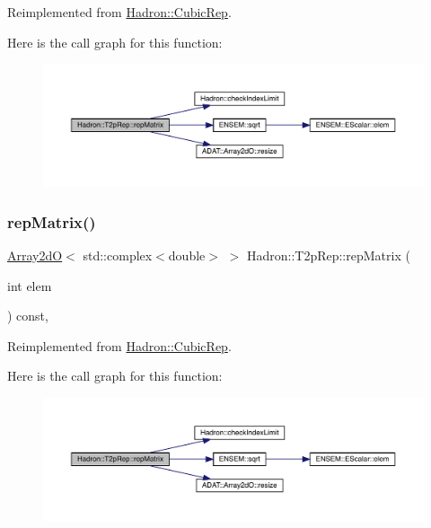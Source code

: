 Reimplemented from \mbox{\hyperlink{structHadron_1_1CubicRep_ac5d7e9e6f4ab1158b5fce3e4ad9e8005}{Hadron\+::\+Cubic\+Rep}}.

Here is the call graph for this function\+:
\nopagebreak
\begin{figure}[H]
\begin{center}
\leavevmode
\includegraphics[width=350pt]{d8/d6b/structHadron_1_1T2pRep_a9800949d2a6f8dcd4dd356947cae0488_cgraph}
\end{center}
\end{figure}
\mbox{\label{structHadron_1_1T2pRep_a9800949d2a6f8dcd4dd356947cae0488}} 
\subsubsection{\texorpdfstring{repMatrix()}{repMatrix()}\hspace{0.1cm}{\footnotesize\ttfamily [3/3]}}
{\footnotesize\ttfamily \mbox{\hyperlink{classADAT_1_1Array2dO}{Array2dO}}$<$ std\+::complex$<$double$>$ $>$ Hadron\+::\+T2p\+Rep\+::rep\+Matrix (\begin{DoxyParamCaption}\item[{int}]{elem }\end{DoxyParamCaption}) const\hspace{0.3cm}{\ttfamily [inline]}, {\ttfamily [virtual]}}



Reimplemented from \mbox{\hyperlink{structHadron_1_1CubicRep_ac5d7e9e6f4ab1158b5fce3e4ad9e8005}{Hadron\+::\+Cubic\+Rep}}.

Here is the call graph for this function\+:
\nopagebreak
\begin{figure}[H]
\begin{center}
\leavevmode
\includegraphics[width=350pt]{d8/d6b/structHadron_1_1T2pRep_a9800949d2a6f8dcd4dd356947cae0488_cgraph}
\end{center}
\end{figure}


